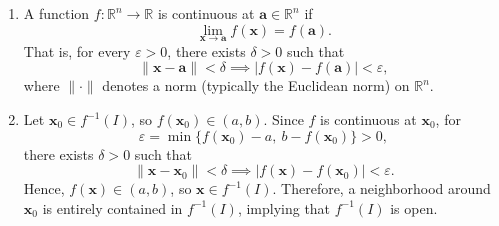 \documentclass[12pt]{article}
\begin{document}
\begin{enumerate}
\begin{enumerate}
    \item 
    A function \( f : \mathbb{R}^n \to \mathbb{R} \) is continuous at \( \mathbf{a} \in \mathbb{R}^n \) if
    \[
    \lim_{\mathbf{x} \to \mathbf{a}} f(\mathbf{x}) = f(\mathbf{a}).
    \]
    That is, for every \( \varepsilon > 0 \), there exists \( \delta > 0 \) such that
    \[
    \|\mathbf{x} - \mathbf{a}\| < \delta \implies |f(\mathbf{x}) - f(\mathbf{a})| < \varepsilon,
    \]
    where \( \|\cdot\| \) denotes a norm (typically the Euclidean norm) on \( \mathbb{R}^n \).

    \item Let \( \mathbf{x}_0 \in f^{-1}(I) \), so \( f(\mathbf{x}_0) \in (a, b) \). Since \( f \) is continuous at \( \mathbf{x}_0 \), for
    \[
    \varepsilon = \min\{ f(\mathbf{x}_0) - a,\ b - f(\mathbf{x}_0) \} > 0,
    \]
    there exists \( \delta > 0 \) such that
    \[
    \|\mathbf{x} - \mathbf{x}_0\| < \delta \implies |f(\mathbf{x}) - f(\mathbf{x}_0)| < \varepsilon.
    \]
    Hence, \( f(\mathbf{x}) \in (a, b) \), so \( \mathbf{x} \in f^{-1}(I) \). Therefore, a neighborhood around \( \mathbf{x}_0 \) is entirely contained in \( f^{-1}(I) \), implying that \( f^{-1}(I) \) is open.


\end{enumerate}


\end{enumerate}
\end{document}
